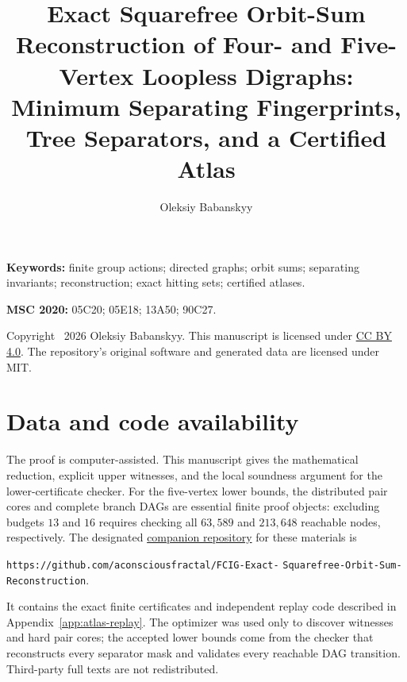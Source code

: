\documentclass[12pt,a4paper]{article}
\title{Exact Squarefree Orbit-Sum Reconstruction of Four- and Five-Vertex
Loopless Digraphs:\\
Minimum Separating Fingerprints, Tree Separators, and a Certified Atlas}
\author{Oleksiy Babanskyy}
\date{}
\begin{document}
\maketitle

\begin{abstract}

\end{abstract}

\smallskip
\noindent\textbf{Keywords:} finite group actions; directed graphs; orbit
sums; separating invariants; reconstruction; exact hitting sets; certified
atlases.

\smallskip
\noindent\textbf{MSC 2020:} 05C20; 05E18; 13A50; 90C27.

\smallskip
\noindent\footnotesize Copyright \textcopyright\ 2026 Oleksiy Babanskyy.
This manuscript is licensed under
\href{https://creativecommons.org/licenses/by/4.0/}{CC BY 4.0}.
The repository's original software and generated data are licensed under MIT.
\normalsize












\appendix





\section*{Data and code availability}
The proof is computer-assisted.  This manuscript gives the mathematical
reduction, explicit upper witnesses, and the local soundness argument for the
lower-certificate checker.  For the five-vertex lower bounds, the distributed
pair cores and complete branch DAGs are essential finite proof objects:
excluding budgets $13$ and $16$ requires checking all $63{,}589$ and
$213{,}648$ reachable nodes, respectively.  The designated
\href{https://github.com/aconsciousfractal/FCIG-Exact-Squarefree-Orbit-Sum-Reconstruction}{companion repository}
for these materials is
\begin{center}
\small
\texttt{https://github.com/aconsciousfractal/FCIG-Exact-}\allowbreak
\texttt{Squarefree-Orbit-Sum-Reconstruction}.
\end{center}
It contains the exact finite certificates and independent replay code
described in Appendix~\ref{app:atlas-replay}.  The optimizer was used only to
discover witnesses and hard pair cores; the accepted lower bounds come from
the checker that reconstructs every separator mask and validates every
reachable DAG transition.  Third-party full texts are not redistributed.
\end{document}
